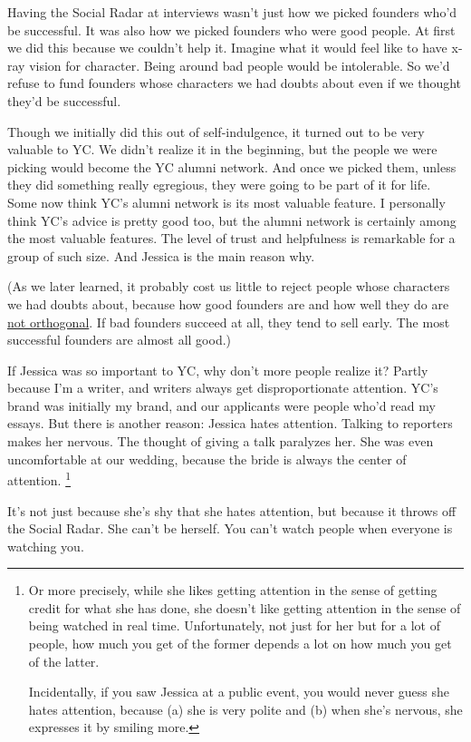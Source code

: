 \documentclass[12pt]{book}
\begin{document}
Having the Social Radar at interviews wasn't just how we picked founders
who'd be successful. It was also how we picked founders who were good
people. At first we did this because we couldn't help it. Imagine what
it would feel like to have x-ray vision for character. Being around bad
people would be intolerable. So we'd refuse to fund founders whose
characters we had doubts about even if we thought they'd be successful.

Though we initially did this out of self-indulgence, it turned out to be
very valuable to YC. We didn't realize it in the beginning, but the
people we were picking would become the YC alumni network. And once we
picked them, unless they did something really egregious, they were going
to be part of it for life. Some now think YC's alumni network is its
most valuable feature. I personally think YC's advice is pretty good
too, but the alumni network is certainly among the most valuable
features. The level of trust and helpfulness is remarkable for a group
of such size. And Jessica is the main reason why.

(As we later learned, it probably cost us little to reject people whose
characters we had doubts about, because how good founders are and how
well they do are \href{mean.html}{not orthogonal}. If bad founders
succeed at all, they tend to sell early. The most successful founders
are almost all good.)

If Jessica was so important to YC, why don't more people realize it?
Partly because I'm a writer, and writers always get disproportionate
attention. YC's brand was initially my brand, and our applicants were
people who'd read my essays. But there is another reason: Jessica hates
attention. Talking to reporters makes her nervous. The thought of giving
a talk paralyzes her. She was even uncomfortable at our wedding, because
the bride is always the center of attention. \footnote{Or more precisely, while she likes getting attention in the
sense of getting credit for what she has done, she doesn't like getting
attention in the sense of being watched in real time. Unfortunately, not
just for her but for a lot of people, how much you get of the former
depends a lot on how much you get of the latter.

Incidentally, if you saw Jessica at a public event, you would never
guess she hates attention, because (a) she is very polite and (b) when
she's nervous, she expresses it by smiling more.}

It's not just because she's shy that she hates attention, but because it
throws off the Social Radar. She can't be herself. You can't watch
people when everyone is watching you.
\end{document}
